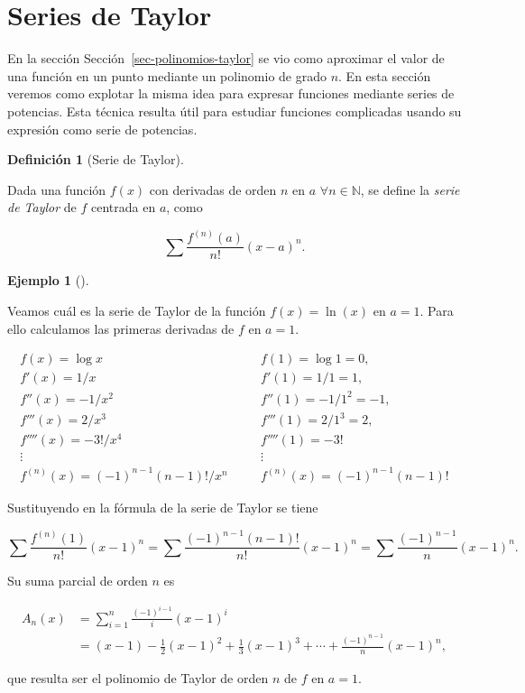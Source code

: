 \documentclass[
  a4paper,
]{scrreport}
\theoremstyle{plain}
\theoremstyle{plain}
\theoremstyle{definition}
\newtheorem{definition}{Definición}[chapter]
\theoremstyle{plain}
\theoremstyle{definition}
\newtheorem{example}{Ejemplo}[chapter]
\theoremstyle{remark}
\begin{document}
\hypertarget{series-de-taylor}{%
\section{Series de Taylor}\label{series-de-taylor}}

En la sección Sección~\ref{sec-polinomios-taylor} se vio como aproximar
el valor de una función en un punto mediante un polinomio de grado
\(n\). En esta sección veremos como explotar la misma idea para expresar
funciones mediante series de potencias. Esta técnica resulta útil para
estudiar funciones complicadas usando su expresión como serie de
potencias.

\leavevmode{}%
\begin{definition}[Serie de Taylor]\label{def-serie-taylor}

Dada una función \(f(x)\) con derivadas de orden \(n\) en \(a\)
\(\forall n\in\mathbb{N}\), se define la \emph{serie de Taylor} de \(f\)
centrada en \(a\), como

\[
\sum \frac{f^{(n)}(a)}{n!}(x-a)^n.
\]

\end{definition}

\leavevmode{}%
\begin{example}[]\label{exm-serie-taylor}

Veamos cuál es la serie de Taylor de la función \(f(x)=\ln(x)\) en
\(a=1\). Para ello calculamos las primeras derivadas de \(f\) en
\(a=1\).

\[
\begin{array}{lll}
f(x)=\log x & \quad & f(1)=\log 1 =0,\\
f'(x)=1/x & & f'(1)=1/1=1,\\
f''(x)=-1/x^2 & & f''(1)=-1/1^2=-1,\\
f'''(x)=2/x^3 & & f'''(1)=2/1^3=2,\\
f''''(x)=-3!/x^4 & & f''''(1) = -3!\\
\vdots & & \vdots\\
f^{(n)}(x) = (-1)^{n-1}(n-1)!/x^n & & f^{(n)}(x) = (-1)^{n-1}(n-1)!
\end{array}
\]

Sustituyendo en la fórmula de la serie de Taylor se tiene

\[
\sum \frac{f^{(n)}(1)}{n!}(x-1)^n = \sum \frac{(-1)^{n-1}(n-1)!}{n!} (x-1)^n = \sum \frac{(-1)^{n-1}}{n}(x-1)^n.
\]

Su suma parcial de orden \(n\) es

\begin{align*}
A_n(x) &= \sum_{i=1}^n \frac{(-1)^{i-1}}{i}(x-1)^i\\ 
&= (x-1)-\frac{1}{2}(x-1)^2 +\frac{1}{3}(x-1)^3+ \cdots +\frac{(-1)^{n-1}}{n}(x-1)^n,
\end{align*}

que resulta ser el polinomio de Taylor de orden \(n\) de \(f\) en
\(a=1\).

\end{example}
\end{document}

